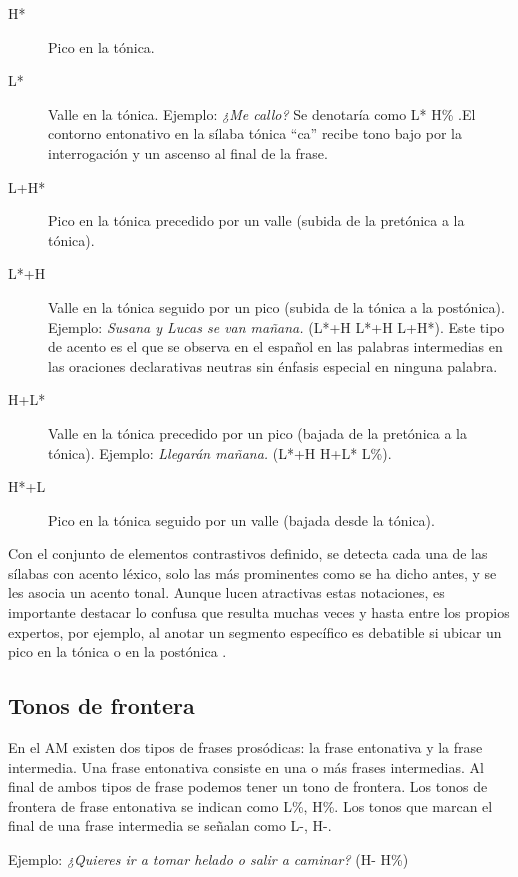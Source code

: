 \begin{description} \label{tonos}
\item[H*] Pico en la tónica.
\item[L*] Valle en la tónica. 
Ejemplo: \emph{¿Me callo?} Se denotaría como L* H\% .El contorno entonativo en la s\'ilaba tónica “ca” recibe tono bajo por la interrogación y un ascenso al final de la frase.
\item[L+H*] Pico en la tónica precedido por un valle (subida de la pretónica a la tónica).
\item[L*+H] Valle en la tónica seguido por un pico (subida de la tónica a la postónica).
Ejemplo: \emph{Susana y Lucas se van ma\~nana.} (L*+H  L*+H  L+H*). Este tipo de acento es el que se observa en el espa\~nol en las palabras intermedias en las oraciones declarativas neutras sin \'enfasis especial en ninguna palabra. 
\item[H+L*] Valle en la tónica precedido por un pico (bajada de la pretónica a la tónica).
Ejemplo: \emph{Llegarán  ma\~nana.} (L*+H  H+L*  L\%).
\item[H*+L] Pico en la tónica seguido por un valle (bajada desde la tónica).
\end{description}



Con el conjunto de elementos contrastivos  definido, se detecta cada una de las s\'ilabas con acento l\'exico, solo las m\'as prominentes como se ha dicho antes, y se les asocia un acento tonal. Aunque lucen atractivas estas notaciones, es importante destacar lo confusa que resulta muchas veces y hasta entre los propios expertos, por ejemplo, al anotar un segmento espec\'ifico es debatible si ubicar un pico en la t\'onica o en la post\'onica \cite[p.72]{pierrehumbert1980phonology}.



\subsection{Tonos de frontera}

En el AM existen dos tipos de frases prosódicas: la frase entonativa y la frase intermedia. Una frase entonativa consiste en una o más frases intermedias. Al final de ambos tipos de frase podemos tener un tono de frontera.
Los tonos de frontera de frase entonativa se indican como L\%, H\%. Los tonos que marcan el final de una frase intermedia se señalan como L-, H-.

Ejemplo: \emph{¿Quieres ir a tomar helado o salir a caminar?} (H- H\%)

